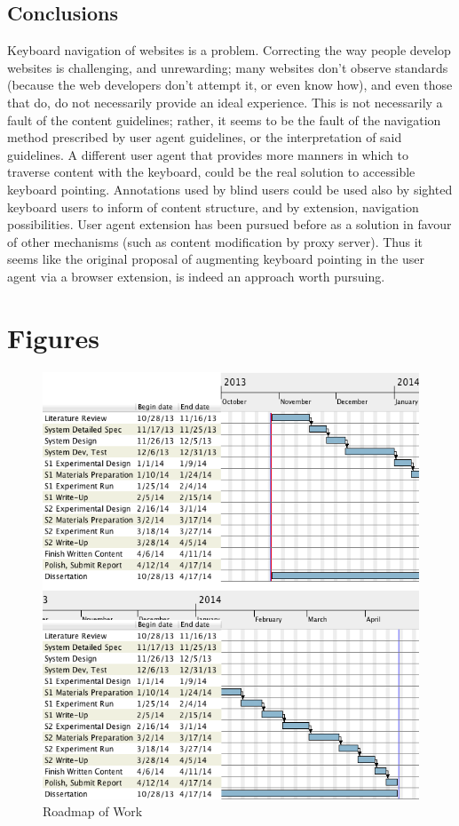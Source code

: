 \documentclass[a4paper, 11pt]{article}
\begin{document}
\subsection{Conclusions}
Keyboard navigation of websites is a problem. Correcting the way people develop websites is challenging, and unrewarding; many websites don't observe standards (because the web developers don't attempt it, or even know how), and even those that do, do not necessarily provide an ideal experience. This is not necessarily a fault of the content guidelines; rather, it seems to be the fault of the navigation method prescribed by user agent guidelines, or the interpretation of said guidelines. A different user agent that provides more manners in which to traverse content with the keyboard, could be the real solution to accessible keyboard pointing. Annotations used by blind users could be used also by sighted keyboard users to inform of content structure, and by extension, navigation possibilities. User agent extension has been pursued before as a solution in favour of other mechanisms (such as content modification by proxy server). Thus it seems like the original proposal of augmenting keyboard pointing in the user agent via a browser extension, is indeed an approach worth pursuing.

\pagebreak
\section{Figures}
\begin{figure}[ht]
\centering
\includegraphics[width=\linewidth]{roadmapcrop2}
\caption{Roadmap of Work}
\label{fig:roadmap}
\end{figure}
%
%
\pagebreak
\printglossary[title=Terms]
\end{document}
